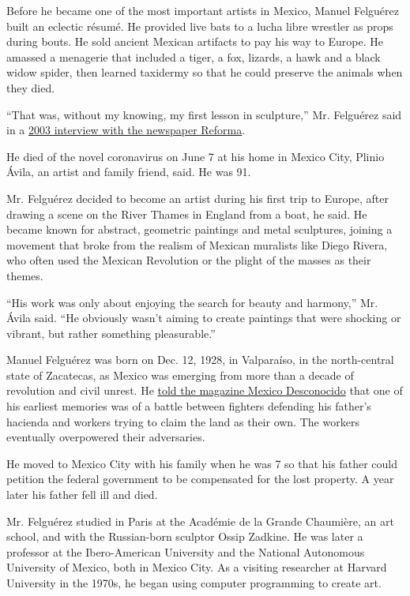 Before he became one of the most important artists in Mexico, Manuel
Felguérez built an eclectic résumé. He provided live bats to a lucha
libre wrestler as props during bouts. He sold ancient Mexican artifacts
to pay his way to Europe. He amassed a menagerie that included a tiger,
a fox, lizards, a hawk and a black widow spider, then learned taxidermy
so that he could preserve the animals when they died.

``That was, without my knowing, my first lesson in sculpture,'' Mr.
Felguérez said in a
\href{https://reforma.vlex.com.mx/vid/manuel-felguerez-contrapesos-tension-82014611}{2003
interview with the newspaper Reforma}.

He died of the novel coronavirus on June 7 at his home in Mexico City,
Plinio Ávila, an artist and family friend, said. He was 91.

Mr. Felguérez decided to become an artist during his first trip to
Europe, after drawing a scene on the River Thames in England from a
boat, he said. He became known for abstract, geometric paintings and
metal sculptures, joining a movement that broke from the realism of
Mexican muralists like Diego Rivera, who often used the Mexican
Revolution or the plight of the masses as their themes.

``His work was only about enjoying the search for beauty and harmony,''
Mr. Ávila said. ``He obviously wasn't aiming to create paintings that
were shocking or vibrant, but rather something pleasurable.''

Manuel Felguérez was born on Dec. 12, 1928, in Valparaíso, in the
north-central state of Zacatecas, as Mexico was emerging from more than
a decade of revolution and civil unrest. He
\href{https://www.mexicodesconocido.com.mx/manuel-felguerez-y-el-museo-arte-abstracto.html}{told
the magazine Mexico Desconocido} that one of his earliest memories was
of a battle between fighters defending his father's hacienda and workers
trying to claim the land as their own. The workers eventually
overpowered their adversaries.

He moved to Mexico City with his family when he was 7 so that his father
could petition the federal government to be compensated for the lost
property. A year later his father fell ill and died.

Mr. Felguérez studied in Paris at the Académie de la Grande Chaumière,
an art school, and with the Russian-born sculptor Ossip Zadkine. He was
later a professor at the Ibero-American University and the National
Autonomous University of Mexico, both in Mexico City. As a visiting
researcher at Harvard University in the 1970s, he began using computer
programming to create art.

